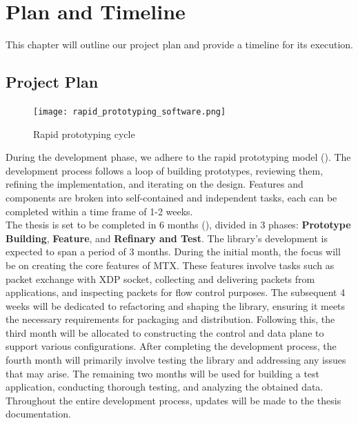 \chapter{Plan and Timeline}\minitoc\label{sec:plan}\vspace{.5cm}

This chapter will outline our project plan and provide a timeline for its execution.

\section{Project Plan}

\begin{figure}[H]
	\centering
	\texttt{[image: rapid\_prototyping\_software.png]}
	\caption{Rapid prototyping cycle \cite{marketsplash_rapid_2021}}
	\label{fig:plan:rapid_prototyping_software}
\end{figure}

During the development phase, we adhere to the rapid prototyping model (). 
The development process follows a loop of building prototypes, reviewing them, refining the implementation, and iterating on the design. 
Features and components are broken into  self-contained and independent tasks, each can be completed within a time frame of 1-2 weeks.
\\


The thesis is set to be completed in 6 months (), divided in 3 phases: \textbf{Prototype Building}, \textbf{Feature}, and \textbf{Refinary and Test}.
The library's development is expected to span a period of 3 months. 
During the initial month, the focus will be on creating the core features of MTX. 
These features involve tasks such as packet exchange with XDP socket, collecting and delivering packets from applications, and inspecting packets for flow control purposes. 
The subsequent 4 weeks will be dedicated to refactoring and shaping the library, ensuring it meets the necessary requirements for packaging and distribution. 
Following this, the third month will be allocated to constructing the control and data plane to support various configurations. 
After completing the development process, the fourth month will primarily involve testing the library and addressing any issues that may arise. 
The remaining two months will be used for building a test application, conducting thorough testing, and analyzing the obtained data. 
Throughout the entire development process, updates will be made to the thesis documentation.

